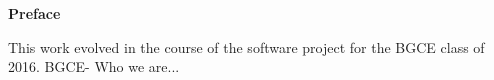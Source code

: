 \clearemptydoublepage
{}
{}	


\vspace*{3cm}

\begin{flushleft}
{\Large \bf Preface}
\end{flushleft}

\vspace{1cm}
This work evolved in the course of the software project for the BGCE class of 2016.
BGCE- Who we are...



\newpage
